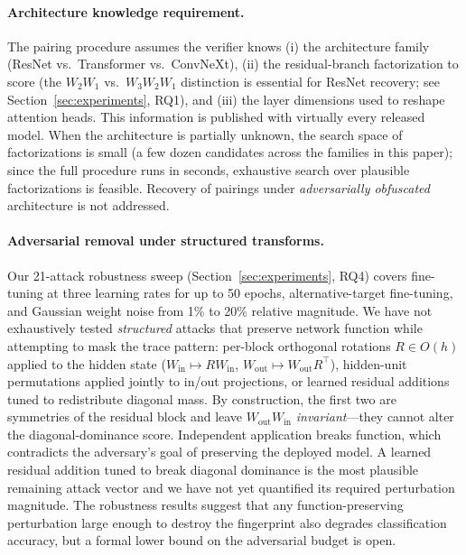 \documentclass[wcp]{jmlr}
\begin{document}
\paragraph{Architecture knowledge requirement.}
The pairing procedure assumes the verifier knows (i) the architecture family (ResNet vs.\ Transformer vs.\ ConvNeXt), (ii) the residual-branch factorization to score (the $W_2W_1$ vs.\ $W_3W_2W_1$ distinction is essential for ResNet recovery; see Section~\ref{sec:experiments}, RQ1), and (iii) the layer dimensions used to reshape attention heads. This information is published with virtually every released model. When the architecture is partially unknown, the search space of factorizations is small (a few dozen candidates across the families in this paper); since the full procedure runs in seconds, exhaustive search over plausible factorizations is feasible. Recovery of pairings under \emph{adversarially obfuscated} architecture is not addressed.

\paragraph{Adversarial removal under structured transforms.}
Our 21-attack robustness sweep (Section~\ref{sec:experiments}, RQ4) covers fine-tuning at three learning rates for up to 50 epochs, alternative-target fine-tuning, and Gaussian weight noise from 1\% to 20\% relative magnitude. We have not exhaustively tested \emph{structured} attacks that preserve network function while attempting to mask the trace pattern: per-block orthogonal rotations $R \in O(h)$ applied to the hidden state ($W_{\mathrm{in}} \mapsto R W_{\mathrm{in}}$, $W_{\mathrm{out}} \mapsto W_{\mathrm{out}} R^\top$), hidden-unit permutations applied jointly to in/out projections, or learned residual additions tuned to redistribute diagonal mass. By construction, the first two are symmetries of the residual block and leave $W_{\mathrm{out}}W_{\mathrm{in}}$ \emph{invariant}---they cannot alter the diagonal-dominance score. Independent application breaks function, which contradicts the adversary's goal of preserving the deployed model. A learned residual addition tuned to break diagonal dominance is the most plausible remaining attack vector and we have not yet quantified its required perturbation magnitude. The robustness results suggest that any function-preserving perturbation large enough to destroy the fingerprint also degrades classification accuracy, but a formal lower bound on the adversarial budget is open.
\end{document}
